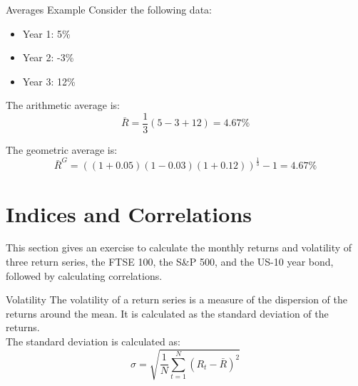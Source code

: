 \begin{examplebox}{Averages Example}
    Consider the following data:
    \begin{itemize}
        \item Year 1: 5\%
        \item Year 2: -3\%
        \item Year 3: 12\%
    \end{itemize}

    The arithmetic average is:
    \begin{equation}
        \bar{R} = \frac{1}{3} (5 - 3 + 12) = 4.67\%
    \end{equation}

    The geometric average is:
    \begin{equation}
        \bar{R}^G = \left( (1 + 0.05)(1 - 0.03)(1 + 0.12) \right)^{\frac{1}{3}} - 1 = 4.67\%
    \end{equation}
\end{examplebox}



\section{Indices and Correlations}

This section gives an exercise to calculate the monthly returns and volatility of three return series, the FTSE 100, the S\&P 500, and the US-10 year bond, followed by calculating correlations.

\begin{sidenotebox}{Volatility}
    The volatility of a return series is a measure of the dispersion of the returns around the mean. It is calculated as the standard deviation of the returns.\\

    The standard deviation is calculated as:
    \begin{equation}
        \sigma = \sqrt{\frac{1}{N} \sum_{t=1}^{N} (R_t - \bar{R})^2}
    \end{equation}
\end{sidenotebox}

